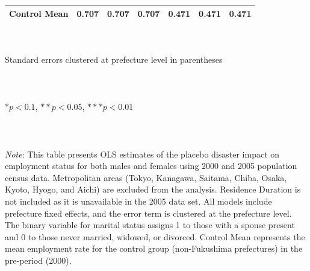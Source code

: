 \documentclass[serif, aspectratio=169]{beamer}
\begin{document}
\begin{frame}[label=employed_placebo]
\begin{table}[htbp]
\begin{tabular}{@{}l*{6}{c}@{}}
Control Mean&    0.707         &    0.707         &    0.707         &    0.471         &    0.471         &    0.471         \\
\bottomrule
\end{tabular}
\\\\{\linewidth}{\tiny Standard errors clustered at prefecture level in parentheses}\\\\
\\\\{\linewidth}{\tiny $*p<0.1$, $**p<0.05$, $***p<0.01$}\\\\
\\\\{\linewidth}{\tiny \textit{Note}: This table presents OLS estimates of the placebo disaster impact on employment status for both males and females using 2000 and 2005 population census data. Metropolitan areas (Tokyo, Kanagawa, Saitama, Chiba, Osaka, Kyoto, Hyogo, and Aichi) are excluded from the analysis. Residence Duration is not included as it is unavailable in the 2005 data set. All models include prefecture fixed effects, and the error term is clustered at the prefecture level. The binary variable for marital status assigns 1 to those with a spouse present and 0 to those never married, widowed, or divorced. Control Mean represents the mean employment rate for the control group (non-Fukushima prefectures) in the pre-period (2000).}
\end{table}


\end{frame}
\end{document}
